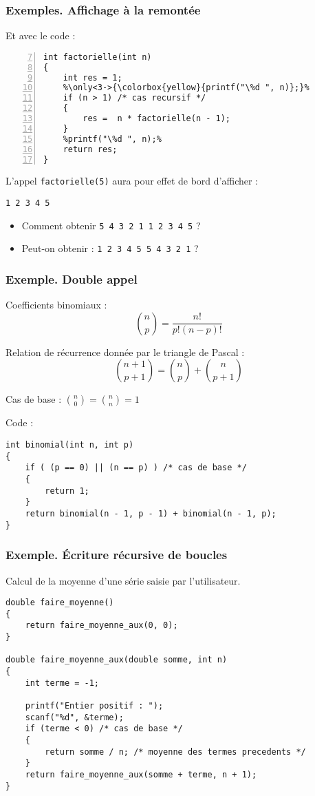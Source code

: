\documentclass[xcolor=svgnames]{beamer}
\begin{document}
\begin{frame}[fragile]
  \frametitle{Exemples. Affichage à la remontée}
Et avec le code : 
\begin{lstlisting}[basicstyle=\ttfamily\scriptsize,numbers=left,firstnumber=7,escapechar={\%}] 
int factorielle(int n)
{
    int res = 1;
    %\only<3->{\colorbox{yellow}{printf("\%d ", n)};}%
    if (n > 1) /* cas recursif */
    {
        res =  n * factorielle(n - 1); 
    } 
    %printf("\%d ", n);%
    return res;
}
\end{lstlisting}
L'appel \verb+factorielle(5)+ aura pour effet de bord d'afficher :
\pause
\begin{verbatim}
1 2 3 4 5
\end{verbatim}

\begin{itemize}
\item  Comment obtenir \verb+5 4 3 2 1 1 2 3 4 5+ ?
\item Peut-on obtenir : \verb+1 2 3 4 5 5 4 3 2 1+  ?
\end{itemize}
\end{frame}

\begin{frame}[fragile]
  \frametitle{Exemple. Double appel}
  Coefficients binomiaux : \[\binom{n}{p} = \frac{n!}{p!(n-p)!}\]

\pause
Relation de récurrence donnée par le triangle de Pascal :
\[
\binom{n + 1}{p + 1}  = \binom{n}{p} + \binom{n}{p + 1}
\]

\pause
Cas de base : $\binom{n}{0} = \binom{n}{n} = 1$

\pause
Code :
\begin{lstlisting}[escapechar={\%},basicstyle=\ttfamily\scriptsize] 
int binomial(int n, int p)
{
    if ( (p == 0) || (n == p) ) /* cas de base */
    {
        return 1; 
    } 
    return binomial(n - 1, p - 1) + binomial(n - 1, p);
}
\end{lstlisting}
\end{frame}


\begin{frame}[fragile]
  \frametitle{Exemple. Écriture récursive de boucles}

Calcul de la moyenne d'une série saisie par l'utilisateur.
\pause
\begin{lstlisting}[basicstyle=\ttfamily\scriptsize] 
double faire_moyenne()
{
    return faire_moyenne_aux(0, 0);
}

double faire_moyenne_aux(double somme, int n)
{
    int terme = -1;

    printf("Entier positif : ");
    scanf("%d", &terme);
    if (terme < 0) /* cas de base */
    {
        return somme / n; /* moyenne des termes precedents */
    }
    return faire_moyenne_aux(somme + terme, n + 1);
}
\end{lstlisting}
\end{frame}
\end{document}

